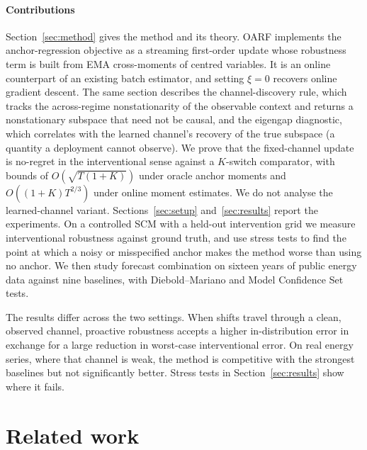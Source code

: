\documentclass[authoryear,preprint,12pt]{elsarticle}
\theoremstyle{plain}
\theoremstyle{remark}
\newcommand{\OARF}{\textsc{OARF}}
\begin{document}
\paragraph{Contributions}
Section~\ref{sec:method} gives the method and its theory. \OARF{} implements the
anchor-regression objective as a streaming first-order update whose robustness term
is built from EMA cross-moments of centred variables. It is an online counterpart of
an existing batch estimator, and setting $\xi=0$ recovers online gradient descent.
The same section describes the channel-discovery rule, which tracks the
across-regime nonstationarity of the observable context and returns a
nonstationary subspace that need not be causal, and the eigengap diagnostic, which
correlates with the learned channel's recovery of the true subspace (a quantity a
deployment cannot observe). We prove that the fixed-channel update is no-regret in
the interventional sense against a $K$-switch comparator, with bounds of
$O(\sqrt{T(1+K)})$ under oracle anchor moments and $O((1{+}K)T^{2/3})$ under online
moment estimates. We do not analyse the learned-channel variant.
Sections~\ref{sec:setup} and~\ref{sec:results} report the experiments. On a
controlled SCM with a held-out intervention grid we measure interventional
robustness against ground truth, and use stress tests to find the point at which a
noisy or misspecified anchor makes the method worse than using no anchor. We then
study forecast combination on sixteen years of public energy data against nine baselines, with Diebold--Mariano \citep{diebold1995dm} and Model Confidence Set
\citep{hansen2011mcs} tests.

\noindent The results differ across the two settings. When shifts travel through a
clean, observed channel, proactive robustness accepts a higher in-distribution
error in exchange for a large reduction in worst-case interventional error. On real
energy series, where that channel is weak, the method is competitive with the
strongest baselines but not significantly better. Stress tests in
Section~\ref{sec:results} show where it fails.

\section{Related work}\label{sec:related}
\end{document}
